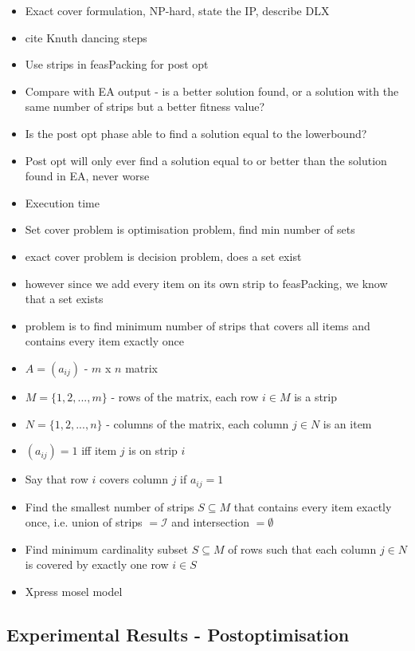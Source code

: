 \documentclass{elsarticle}
\begin{document}
{\color{myGreen}
\begin{itemize}[leftmargin=*]
	\item Exact cover formulation, NP-hard, state the IP, describe DLX
	\item cite Knuth \cite{knuth2000} dancing steps
	\item Use strips in feasPacking for post opt
	\item Compare with EA output - is a better solution found, or a solution with the same number of strips but a better fitness value?
	\item Is the post opt phase able to find a solution equal to the lowerbound?
	\item Post opt will only ever find a solution equal to or better than the solution found in EA, never worse
	\item Execution time
	\item Set cover problem is optimisation problem, find min number of sets
	\item exact cover problem is decision problem, does a set exist
	\item however since we add every item on its own strip to feasPacking, we know that a set exists
	\item problem is to find minimum number of strips that covers all items and contains every item exactly once
	\item $A = (a_{ij})$ - $m$ x $n$ matrix
	\item $M = \{1, 2,..., m\}$ - rows of the matrix, each row $i \in M$ is a strip
	\item $N = \{1, 2,...,n\}$ - columns of the matrix, each column $j \in N$ is an item
	\item $(a_{ij}) = 1$ iff item $j$ is on strip $i$
	\item Say that row $i$ covers column $j$ if $a_{ij} = 1$
	\item Find the smallest number of strips $S \subseteq M$ that contains every item exactly once, i.e. union of strips $= \mathcal{I}$ and intersection $= \emptyset$
	\item Find minimum cardinality subset $S \subseteq M$ of rows such that each column $j \in N$ is covered by exactly one row $i \in S$
	\item Xpress mosel model
\end{itemize}
}





\subsection{Experimental Results - Postoptimisation}
\label{sub:exppostopt}
\end{document}
